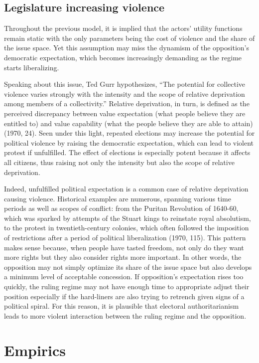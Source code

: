 \documentclass[12pt]{article}
\begin{document}
\subsection{Legislature increasing violence}
Throughout the previous model, it is implied that the actors’ utility functions remain static with the only parameters being the cost of violence and the share of the issue space. Yet this assumption may miss the dynamism of the opposition’s democratic expectation, which becomes increasingly demanding as the regime starts liberalizing.

Speaking about this issue, Ted Gurr hypothesizes, “The potential for collective violence varies strongly with the intensity and the scope of relative deprivation among members of a collectivity.” Relative deprivation, in turn, is defined as the perceived discrepancy between value expectation (what people believe they are entitled to) and value capability (what the people believe they are able to attain) (1970, 24). Seen under this light, repeated elections may increase the potential for political violence by raising the democratic expectation, which can lead to violent protest if unfulfilled. The effect of elections is especially potent because it affects all citizens, thus raising not only the intensity but also the scope of relative deprivation.

Indeed, unfulfilled political expectation is a common case of relative deprivation causing violence. Historical examples are numerous, spanning various time periods as well as scopes of conflict: from the Puritan Revolution of 1640-60, which was sparked by attempts of the Stuart kings to reinstate royal absolutism, to the protest in twentieth-century colonies, which often followed the imposition of restrictions after a period of political liberalization (1970, 115). This pattern makes sense because, when people have tasted freedom, not only do they want more rights but they also consider rights more important. In other words, the opposition may not simply optimize its share of the issue space but also develops a minimum level of acceptable concession. If opposition’s expectation rises too quickly, the ruling regime may not have enough time to appropriate adjust their position especially if the hard-liners are also trying to retrench given signs of a political spiral. For this reason, it is plausible that electoral authoritarianism leads to more violent interaction between the ruling regime and the opposition.

\section{Empirics}
\end{document}
